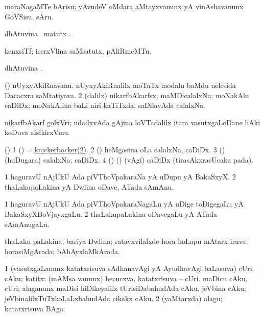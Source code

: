 \noindent
\gl{\nuga}
\bmng
{} maraNagaMTe bArisu; yAvudeV oMdara aMtayxvanunx yA vinAshavanunx GoVSisu, sAru. 
\emng
\eentry

\bentry
{}
\gl{\kirx}
\bmng
{} dhAtuvina \BU\ matutx \BUkaq. 
\emng
\eentry

\bentry
{}
\gl{\nA}
\bmng
kenxsiTf; iserxVlina saMsatutx, pAliRmeMTu. 
\emng
\eentry

\bentry
{}
\gl{\kirx}
\bmng
{} dhAtuvina \BU. 
\emng
\eentry

\bentry
{}
\gl{\nA}
\bmng
\bnum
{} () 
\banum
{} nUyxyAkiRnavanu. 
 nUyxyAkiRnalilx moTaTx modalu baMdu nelesida Dacacxra saMtatiyava. 
\hypertarget{knickerbocker(2)}{} 
\eanum
\numie
\num{2} (\bava dalilx) nikarfbAkarfsx; maMDicalalxNa; moNakAlu caDiDx; moNakAlina baLi niri kaTiTxda, saDilavAda calalxNa.  
\enum
\emng

\noindent
\gl{\pagu}
\bmng
{} nikarfbAkarf golxVri; udadxvAda gAjina loVTadalilx itara vasutxgaLoDane hAki koDuva aisfkirxVmu. 
\emng
\eentry

\bentry
{}
\gl{\nA}
\bmng
(\bava) 
\bnum
\num{1} (\ame) = \hyperlink{knickerbocker(2)}{knickerbocker(2)}. 
\num{2} (\birx) heMgasina oLa calalxNa, caDiDx. 
\num{3} (\ame) (huDugara) calalxNa; caDiDx. 
\num{4} (\birx) (\ashi) (\BAavayx vAgi) caDiDx (tirasAkxrasUcaka pada). 
\enum
\emng
\eentry

\bentry
{}
\gl{\nA}
\bmng
\bnum
\num{1} haguravU nAjUkU Ada piVThoVpakaraNa yA uDupu yA BakaSxyX. 
\num{2} thaLakupaLakina yA Dwlina oDave, ATada sAmAnu. 
\enum
\emng
\eentry

\bentry
{}
\gl{\nA}
\bmng
\bnum
\num{1} haguravU nAjUkU Ada piVThoVpakaraNagaLu yA uDige toDigegaLu yA BakaSxyXBoVjayxgaLu. 
\num{2} thaLakupaLakina oDavegaLu yA ATada sAmAnugaLu. 
\enum
\emng
\eentry

\bentry
{}
\gl{\gu}
\bmng
thaLaku paLakina; bariya Dwlina; satavxvilalxde hora hoLapu mAtarx iruva; horasiMgArada; bAhAyxlaMkArada. 
\emng
\eentry

\bentry
{}
\gl{\nA}
\bmng
\bnum
\num{1} (vasutxgaLanunx katatxrisuva sAdhanavAgi yA AyudhavAgi baLasuva) cUri; cAku; katitx:  (mAMsa \mo vanunx) hecucxva, katatxrisuva -- cUri.  maDicu cAku, cUri; alaganunx maDisi hiDikeyalilx tUrisiDabahudAda cAku.  jeVbina cAku; jeVbinalilxTuTxkoLaLxbahudAda cikakx cAku. 
\num{2} (yaMtarxda) alagu; katatxrisuva BAga. 
\enum
\emng

